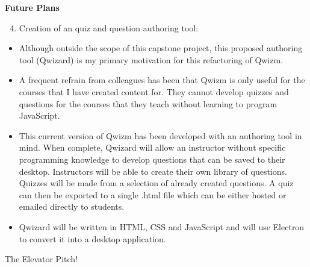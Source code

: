 \documentclass[11pt,xcolor={svgnames, x11names}]{beamer}
\begin{document}
\begin{frame}{\bf Future Plans}

	\begin{enumerate}
		\setcounter{enumi}{3}
		\item<1-|alert@1-> Creation of an quiz and question authoring tool:
	\end{enumerate}
	\begin{itemize}
		\item<2-|alert@2> Although outside the scope of this capstone project, this proposed authoring tool (Qwizard) is my primary motivation for this refactoring of Qwizm. \pars
		\item<3-|alert@3> A frequent refrain from colleagues has been that Qwizm is only useful for the courses that I have created content for. They cannot develop quizzes and questions for the courses that they teach without learning to program JavaScript.\pars
		\item<4-|alert@4> This current version of Qwizm has been developed with an authoring tool in mind. When complete, Qwizard will allow an instructor without specific programming knowledge to develop questions that can be saved to their desktop. Instructors will be able to create their own library of questions. Quizzes will be made from a selection of already created questions. A quiz can then be exported to a single .html file which can be either hosted or emailed directly to students. \pars
		\item<5-|alert@5> Qwizard will be written in HTML, CSS and JavaScript and will use Electron to convert it into a desktop application.
	\end{itemize}
\end{frame}

\begin{frame}{The Elevator Pitch!}
	~
\end{frame}


	
\end{document}
